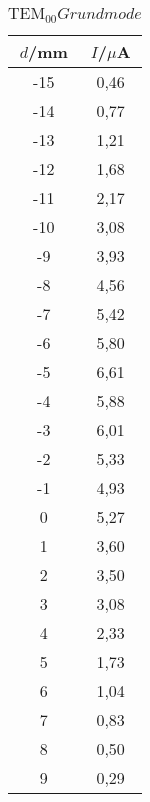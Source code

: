 \begin{table}[H]
	\begin{center}
		\begin{tabular}{c c}
			\toprule
			\(d\)/mm & \(I\)/\(\mu\)A \\
			\midrule
			-15  &  0,46\\                                                                                            
			-14     &0,77  \\                                                                                          
			-13     &1,21    \\                                                                                        
			-12     &1,68      \\                                                                                      
			-11     &2,17        \\                                                                                    
			-10     &3,08          \\                                                                                  
			-9      &3,93             \\                                                                               
			-8      &4,56               \\                                                                             
			-7      &5,42                 \\
			-6      &5,80                   \\                                                                         
			-5      &6,61                     \\                                                                       
			-4      &5,88                       \\                                                                     
			-3      &6,01                         \\                                                                   
			-2      &5,33                           \\
			-1      &4,93\\
			0       &5,27\\
			1       &3,60\\
			2       &3,50\\
			3       &3,08\\
			4       &2,33\\
			5       &1,73\\
			6       &1,04\\
			7       &0,83\\
			8       &0,50\\
			9       &0,29\\
			\bottomrule
		\end{tabular}
		\caption{\(\text{TEM}_{00} Grundmode\)}
		\label{fig:t4}
	\end{center}
\end{table}

